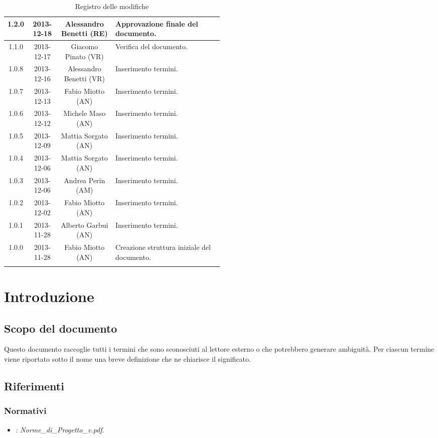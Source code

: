 \begin{center}
\begin{longtable}{|c|c|c|p{0.5\linewidth}|}
\midrule
1.2.0 & 2013-12-18 & Alessandro Benetti (RE) & Approvazione finale del documento.\\
\midrule
1.1.0 & 2013-12-17 & Giacomo Pinato (VR) & Verifica del documento. \\
\midrule
1.0.8 & 2013-12-16 & Alessandro Benetti (VR) & Inserimento termini.\\
\midrule
1.0.7 & 2013-12-13 & Fabio Miotto (AN) & Inserimento termini.\\
\midrule
1.0.6 & 2013-12-12 & Michele Maso (AN) & Inserimento termini.\\
\midrule
1.0.5 & 2013-12-09 & Mattia Sorgato (AN) & Inserimento termini.\\
\midrule
1.0.4 & 2013-12-06 & Mattia Sorgato (AN) & Inserimento termini. \\
\midrule
1.0.3 & 2013-12-06 & Andrea Perin (AM) & Inserimento termini.\\
\midrule
1.0.2 & 2013-12-02 & Fabio Miotto (AN) & Inserimento termini.\\
\midrule
1.0.1 & 2013-11-28 & Alberto Garbui (AN) & Inserimento termini.\\
\midrule
1.0.0 & 2013-11-28 & Fabio Miotto (AN) & Creazione struttura iniziale del documento.\\


\bottomrule
\caption{Registro delle modifiche}
\label{tab:changelog}
\end{longtable}
\end{center}


\newpage
\section{Introduzione}%
\label{1.0}
\subsection{Scopo del documento}%
\label{1.1}
Questo documento raccoglie tutti i termini che sono sconosciuti al lettore esterno o che potrebbero generare ambiguità. Per ciascun termine viene riportato sotto il nome una breve definizione che ne chiarisce il significato.
\subsection{Riferimenti} %
\label{1.4}
\subsubsection{Normativi} %
\label{1.4.1}
\begin{itemize}
\item {}: \emph{Norme\_{}di\_{}Progetto\_{}v\versioneNormeDiProgetto{}.pdf}.\\
\end{itemize}
